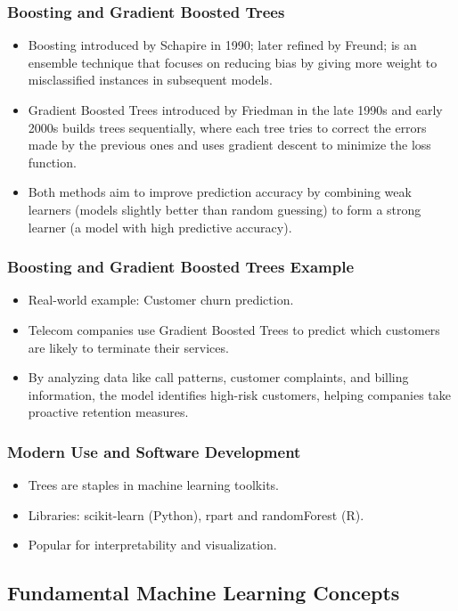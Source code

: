 \documentclass{beamer}
\begin{document}
\begin{frame}
\frametitle{Boosting and Gradient Boosted Trees}
\begin{itemize}
    \item Boosting introduced by Schapire in 1990; later refined by Freund; is an ensemble technique that focuses on reducing bias by giving more weight to misclassified instances in subsequent models.
    \item Gradient Boosted Trees introduced by Friedman in the late 1990s and early 2000s builds trees sequentially, where each tree tries to correct the errors made by the previous ones and uses gradient descent to minimize the loss function.
    \item Both methods aim to improve prediction accuracy by combining weak learners (models slightly better than random guessing) to form a strong learner (a model with high predictive accuracy).
\end{itemize}
\end{frame}

\begin{frame}
\frametitle{Boosting and Gradient Boosted Trees Example}
\begin{itemize}
    \item Real-world example: Customer churn prediction. 
    \item Telecom companies use Gradient Boosted Trees to predict which customers are likely to terminate their services.
    \item By analyzing data like call patterns, customer complaints, and billing information, the model identifies high-risk customers, helping companies take proactive retention measures.
\end{itemize}
\end{frame}


\begin{frame}
\frametitle{Modern Use and Software Development}
\begin{itemize}
    \item Trees are staples in machine learning toolkits.
    \item Libraries: scikit-learn (Python), rpart and randomForest (R).
    \item Popular for interpretability and visualization.
\end{itemize}
\end{frame}

\subsection{Fundamental Machine Learning Concepts}
\end{document}
